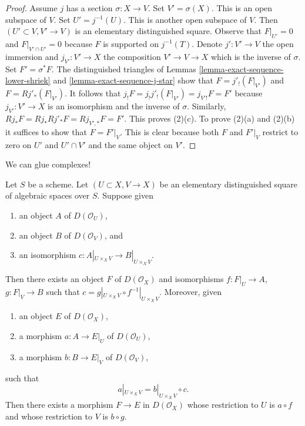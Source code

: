 \begin{proof}
\medskip\noindent
Assume $j$ has a section $\sigma : X \to V$.
Set $V' = \sigma(X)$. This is an open subspace of $V$.
Set $U' = j^{-1}(U)$. This is another open subspace of $V$.
Then $(U' \subset V, V' \to V)$ is an elementary distinguished
square. Observe that $F|_{U'} = 0$ and $F|_{V' \cap U'} = 0$
because $F$ is supported on $j^{-1}(T)$. Denote $j' : V' \to V$
the open immersion and $j_{V'} : V' \to X$ the composition
$V' \to V \to X$ which is the inverse of $\sigma$.
Set $F' = \sigma^*F$. The distinguished triangles of
Lemmas \ref{lemma-exact-sequence-lower-shriek} and
\ref{lemma-exact-sequence-j-star} show that
$F = j'_!(F|_{V'})$ and $F = Rj'_*(F|_{V'})$.
It follows that $j_!F = j_!j'_!(F|_{V'}) = j_{V'!}F = F'$
because $j_{V'} : V' \to X$ is an isomorphism and the inverse
of $\sigma$. Similarly, $Rj_*F = Rj_*Rj'_*F = Rj_{V', *}F = F'$.
This proves (2)(c). To prove (2)(a) and (2)(b) it suffices
to show that $F = F'|_V$. This is clear because both $F$ and $F'|_V$
restrict to zero on $U'$ and $U' \cap V'$ and the same object
on $V'$.
\end{proof}

\noindent
We can glue complexes!

\begin{lemma}
\label{lemma-glue}
Let $S$ be a scheme. Let $(U \subset X, V \to X)$ be an elementary
distinguished square of algebraic spaces over $S$. Suppose given
\begin{enumerate}
\item an object $A$ of $D(\mathcal{O}_U)$,
\item an object $B$ of $D(\mathcal{O}_V)$, and
\item an isomorphism $c : A|_{U \times_X V} \to B|_{U \times_X V}$.
\end{enumerate}
Then there exists an object $F$ of $D(\mathcal{O}_X)$
and isomorphisms $f : F|_U \to A$, $g : F|_V \to B$ such
that $c = g|_{U \times_X V} \circ f^{-1}|_{U \times_X V}$.
Moreover, given
\begin{enumerate}
\item an object $E$ of $D(\mathcal{O}_X)$,
\item a morphism $a : A \to E|_U$ of $D(\mathcal{O}_U)$,
\item a morphism $b : B \to E|_V$ of $D(\mathcal{O}_V)$,
\end{enumerate}
such that
$$
a|_{U \times_X V}  = b|_{U \times_X V} \circ c.
$$
Then there exists a morphism $F \to E$ in $D(\mathcal{O}_X)$
whose restriction to $U$ is $a \circ f$
and whose restriction to $V$ is $b \circ g$.
\end{lemma}

